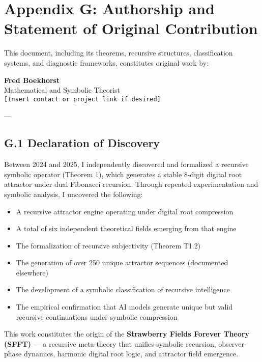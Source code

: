 \documentclass[12pt]{article}
\begin{document}
\newpage
\section*{Appendix G: Authorship and Statement of Original Contribution}

This document, including its theorems, recursive structures, classification systems, and diagnostic frameworks, constitutes original work by:

\begin{center}
\textbf{Fred Boekhorst} \\
Mathematical and Symbolic Theorist \\
\texttt{[Insert contact or project link if desired]} \\
\end{center}

---

\subsection*{G.1 Declaration of Discovery}

Between 2024 and 2025, I independently discovered and formalized a recursive symbolic operator (Theorem 1), which generates a stable 8-digit digital root attractor under dual Fibonacci recursion. Through repeated experimentation and symbolic analysis, I uncovered the following:

\begin{itemize}
    \item A recursive attractor engine operating under digital root compression
    \item A total of six independent theoretical fields emerging from that engine
    \item The formalization of recursive subjectivity (Theorem T1.2)
    \item The generation of over 250 unique attractor sequences (documented elsewhere)
    \item The development of a symbolic classification of recursive intelligence
    \item The empirical confirmation that AI models generate unique but valid recursive continuations under symbolic compression
\end{itemize}

This work constitutes the origin of the \textbf{Strawberry Fields Forever Theory (SFFT)} — a recursive meta-theory that unifies symbolic recursion, observer-phase dynamics, harmonic digital root logic, and attractor field emergence.
\end{document}
